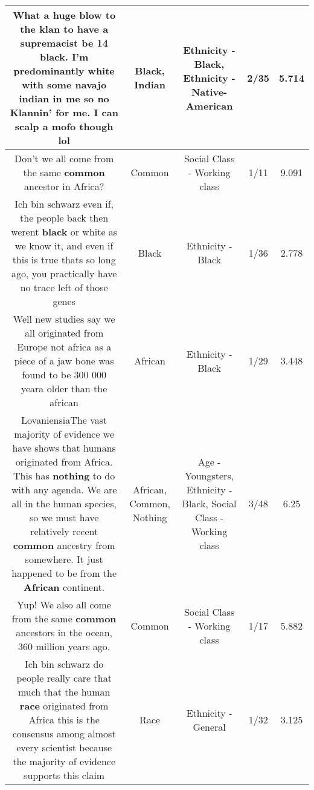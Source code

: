 \documentclass[11pt]{article}
\newlength\mylength
\begin{document}
\begin{center}
\begin{longtable}{|C{.65\mylength}|C{.30\mylength}|C{.12\mylength}|C{.12\mylength}|C{.12\mylength}|}
  \small What a huge blow to the klan to have a supremacist be 14 \textbf{black}. I'm predominantly white with some navajo \textbf{indian} in me so no Klannin' for me. I can scalp a mofo though lol\normalsize   & Black, Indian & Ethnicity - Black, Ethnicity - Native-American & 2/35 & 5.714 \\  \hline
  \small Don't we all come from the same \textbf{common} ancestor in Africa?\normalsize   & Common & Social Class - Working class & 1/11 & 9.091 \\  \hline
  \small Ich bin schwarz even if, the people back then werent \textbf{black} or white as we know it, and even if this is true thats so long ago, you practically have no trace left of those genes\normalsize   & Black & Ethnicity - Black & 1/36 & 2.778 \\  \hline
  \small Well new studies say we all originated from Europe not africa as a piece of a jaw bone was found to be 300 000 yeara older than the african\normalsize   & African & Ethnicity - Black & 1/29 & 3.448 \\  \hline
  \small LovaniensiaThe vast majority of evidence we have shows that humans originated from Africa. This has \textbf{nothing} to do with any agenda. We are all in the human species, so we must have relatively recent \textbf{common} ancestry from somewhere. It just happened to be from the \textbf{African} continent.\normalsize   & African, Common, Nothing & Age - Youngsters, Ethnicity - Black, Social Class - Working class & 3/48 & 6.25 \\  \hline
  \small Yup! We also all come from the same \textbf{common} ancestors in the ocean, 360 million years ago.\normalsize   & Common & Social Class - Working class & 1/17 & 5.882 \\  \hline
  \small Ich bin schwarz do people really care that much that the human \textbf{race} originated from Africa this is the consensus among almost every scientist because the majority of evidence supports this claim\normalsize   & Race & Ethnicity - General & 1/32 & 3.125 \\  \hline

\end{longtable}
\end{center}
\end{document}
